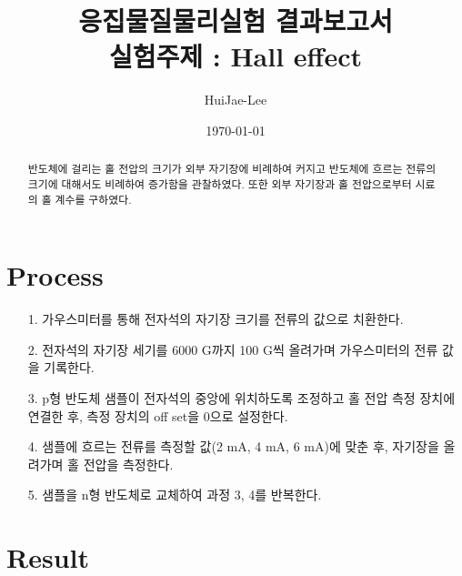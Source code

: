 \documentclass[aps,reprint,superscriptaddress,10pt]{revtex4-2}
\begin{document}
\title{응집물질물리실험 결과보고서 \\
\small 실험주제 : Hall effect}

\author{HuiJae-Lee}

\date{\today}


\begin{abstract}
반도체에 걸리는 홀 전압의 크기가 외부 자기장에 비례하여 커지고 반도체에 흐르는 전류의 크기에
대해서도 비례하여 증가함을 관찰하였다. 또한 외부 자기장과 홀 전압으로부터 시료의 홀 계수를
구하였다.
\end{abstract}
 
 \maketitle
 
 \section{Process}
 \begin{itemize}
     \item[1.]
     가우스미터를 통해 전자석의 자기장 크기를 전류의 값으로 치환한다.
     \item[2.] 전자석의 자기장 세기를 6000 G까지 100 G씩 올려가며 가우스미터의 
     전류 값을 기록한다.
     \item[3.] p형 반도체 샘플이 전자석의 중앙에 위치하도록 조정하고 홀 전압 측정 장치에 
     연결한 후, 측정 장치의 off set을 0으로 설정한다. 
     \item[4.] 샘플에 흐르는 전류를 측정할 값(2 mA, 4 mA, 6 mA)에 맞춘 후, 자기장을
     올려가며 홀 전압을 측정한다.
     \item[5.] 샘플을 n형 반도체로 교체하여 과정 3, 4를 반복한다.
   \end{itemize}
\section{Result}
\end{document}
